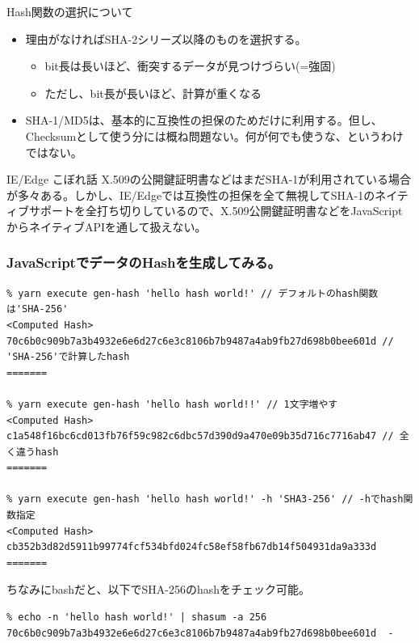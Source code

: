 \documentclass[12pt,dvipdfmx]{beamer}
\begin{document}
\begin{frame}
\begin{block}{\small Hash関数の選択について}
\begin{itemize}
 \item 理由がなければSHA-2シリーズ以降のものを選択する。
\begin{itemize}
 \item bit長は長いほど、衝突するデータが見つけづらい(=強固)
 \item ただし、bit長が長いほど、計算が重くなる
\end{itemize}
 \item SHA-1/MD5は、基本的に互換性の担保のためだけに利用する。但し、Checksumとして使う分には概ね問題ない。\alert{何が何でも使うな、というわけではない。}
\end{itemize}
\end{block}

\begin{exampleblock}{\small IE/Edge こぼれ話}
\small
X.509の公開鍵証明書などはまだSHA-1が利用されている場合が多々ある。しかし、\alert{IE/Edgeでは互換性の担保を全て無視してSHA-1のネイティブサポートを全打ち切り}しているので、X.509公開鍵証明書などをJavaScriptからネイティブAPIを通して扱えない。
\end{exampleblock}
\end{frame}

\begin{frame}[fragile]
\frametitle{JavaScriptでデータのHashを生成してみる。}
\begin{exampleblock}{}
\scriptsize
\begin{verbatim}
% yarn execute gen-hash 'hello hash world!' // デフォルトのhash関数は'SHA-256'
<Computed Hash>
70c6b0c909b7a3b4932e6e6d27c6e3c8106b7b9487a4ab9fb27d698b0bee601d // 'SHA-256'で計算したhash
=======

% yarn execute gen-hash 'hello hash world!!' // 1文字増やす
<Computed Hash>
c1a548f16bc6cd013fb76f59c982c6dbc57d390d9a470e09b35d716c7716ab47 // 全く違うhash
=======

% yarn execute gen-hash 'hello hash world!' -h 'SHA3-256' // -hでhash関数指定
<Computed Hash>
cb352b3d82d5911b99774fcf534bfd024fc58ef58fb67db14f504931da9a333d
=======
\end{verbatim}
\end{exampleblock}

ちなみにbashだと、以下でSHA-256のhashをチェック可能。

\begin{exampleblock}{}
\scriptsize
\begin{verbatim}
% echo -n 'hello hash world!' | shasum -a 256   
70c6b0c909b7a3b4932e6e6d27c6e3c8106b7b9487a4ab9fb27d698b0bee601d  -
\end{verbatim}
\end{exampleblock}

\end{frame}
\end{document}
